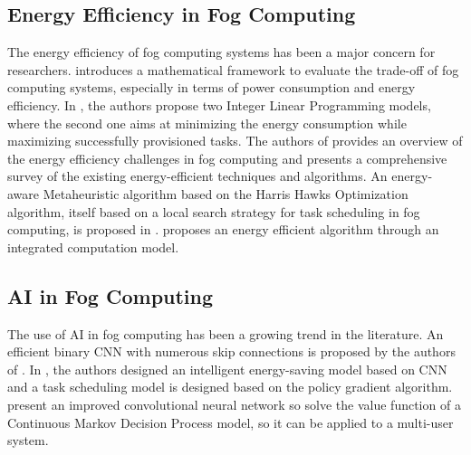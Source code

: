 \subsection*{Energy Efficiency in Fog Computing}

The energy efficiency of fog computing systems has been a major concern for researchers. \cite{alhumaima-2020}
introduces a mathematical framework to evaluate the trade-off of fog computing systems, especially in terms of power
consumption and energy efficiency. In \cite{he-et-al-2020}, the authors propose two Integer Linear Programming models,
where the second one aims at minimizing the energy consumption while maximizing successfully provisioned tasks. The
authors of \cite{malik-et-al-2022} provides an overview of the energy efficiency challenges in fog computing and
presents a comprehensive survey of the existing energy-efficient techniques and algorithms. An energy-aware
Metaheuristic algorithm based on the Harris Hawks Optimization algorithm, itself based on a local search strategy for
task scheduling in fog computing, is proposed in \cite{abdel-basset-et-al-2021}. \cite{wang-et-al-2023} proposes an
energy efficient algorithm through an integrated computation model.

\subsection*{AI in Fog Computing}

The use of AI in fog computing has been a growing trend in the literature. An efficient binary CNN with numerous skip
connections is proposed by the authors of \cite{wu-et-al-2021}. In \cite{yang-et-al-2022}, the authors designed an
intelligent energy-saving model based on CNN and a task scheduling model is designed based on the policy gradient
algorithm. \cite{jing-xue-2023} present an improved convolutional neural network so solve the value function of a
Continuous Markov Decision Process model, so it can be applied to a multi-user system.
